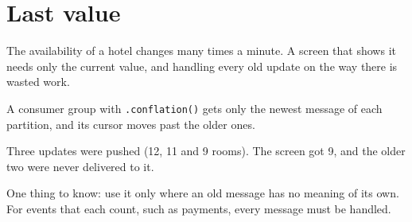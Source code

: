 %

\section{Last value}

The availability of a hotel changes many times a minute. A screen that shows it needs only the
current value, and handling every old update on the way there is wasted work.

A consumer group with \texttt{.conflation()} gets only the newest message of each partition, and its
cursor moves past the older ones.



Three updates were pushed (12, 11 and 9 rooms). The screen got 9, and the older two were never
delivered to it.


One thing to know: use it only where an old message has no meaning of its own. For events that
each count, such as payments, every message must be handled.
